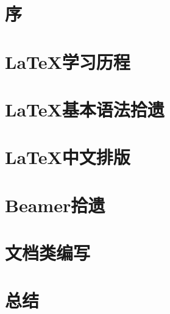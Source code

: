 \documentclass[11pt]{ctexart}
\title{\heiti{\LaTeX 总结}}
\author{\kaishu{北方以北}}
\begin{document}
\maketitle

\tableofcontents

\section{序}

\section{\LaTeX 学习历程}

\section{\LaTeX 基本语法拾遗}

\section{\LaTeX 中文排版}

\section{Beamer拾遗}

\section{文档类编写}

\section{总结}
\end{document}

